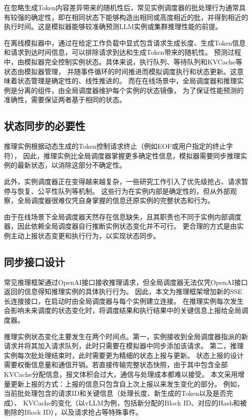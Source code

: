 在忽略生成Token内容差异带来的随机性后，常见实例调度器的批处理行为通常具有较强的确定性，即在相同状态下能够构造出相同或高度相近的批，并得到相近的执行时间。这是模拟器能够较准确预测LLM实例或集群推理性能的前提。

在离线模拟器中，通过在给定工作负载中显式包含请求生成长度、生成Token信息和请求到达时间信息，可以排除请求到达和生成Token带来的随机性。
预测过程中，由模拟器完全控制实例状态。具体来说，执行队列、等待队列和KVCache等状态由模拟器管理，
并随事件循环的时间推进而模拟调度执行和状态更新。这意味着状态管理是确定性的、线性推进的。
而在在线场景中，全局调度器和推理实例是分离的组件，由全局调度器维护每个实例的状态镜像，
为了保证性能预测的准确性，需要保证两者基于相同的状态。

\subsection{状态同步的必要性}
推理实例根据动态生成的Token控制请求终止（例如EOF或用户指定的终止字符），
因此，推理实例比全局调度器掌握更多确定性信息，模拟器需要同步推理实例的最新状态，以消除这部分不确定性。

此外，实例调度器正在变得越来越复杂，一些研究工作引入了优先级抢占、请求暂停与恢复、公平性队列等机制。
这些行为在实例内部是确定性的，但从外部观察，全局调度器很难仅凭自身掌握的信息还原实例的完整状态和行为。

由于在线场景下全局调度器天然存在信息缺失，且其职责也不同于实例内部调度器，因此依赖全局调度器自行推断实例状态变化并不可行。
更合理的方式是由实例主动上报状态变更和执行行为，以实现状态同步。

\subsection{同步接口设计}

常见推理框架通过OpenAI接口接收推理请求，但全局调度器无法仅凭OpenAI接口返回的信息得知推理实例的具体执行行为。
因此，本文为推理框架增加新的SSE长连接接口，在启动时由全局调度器与每个实例建立连接。
在推理实例每次发生会影响未来调度的状态变化时，将调度结果和执行结果中的关键信息上报给全局调度器。

推理实例状态变化主要发生在两个时间点。第一，实例接收到全局调度器指派的新请求并将其加入请求队列，此时只需要在模拟器中同步添加该请求。
第二，推理实例每次批处理结束时，此时需要更为精细的状态上报与更新。
状态上报的设计需要权衡信息量和通信开销。若直接传输完整状态快照，由于其中包含全部KVCache分配信息，报文体积会过大，通信与处理成本都难以接受。
本文采用增量更新上报的方式：上报的信息只包含自上次上报以来发生变化的部分。
例如，当前批处理包含的请求ID和关键信息（处理长度、新生成的Token以及是否完成）、
KVCache的变化（以vLLM为例，包括新分配的Block ID、对应的Hash和被剔除的Block ID），以及请求抢占等特殊事件。

